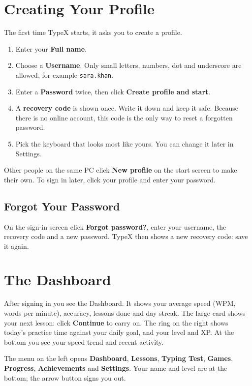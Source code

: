 \chapter{Creating Your Profile}
The first time TypeX starts, it asks you to create a profile.
\begin{enumerate}
\item Enter your \textbf{Full name}.
\item Choose a \textbf{Username}. Only small letters, numbers, dot and underscore are allowed, for example \texttt{sara.khan}.
\item Enter a \textbf{Password} twice, then click \textbf{Create profile and start}.
\item A \textbf{recovery code} is shown once. Write it down and keep it safe. Because there is no online account, this code is the only way to reset a forgotten password.
\item Pick the keyboard that looks most like yours. You can change it later in Settings.
\end{enumerate}
Other people on the same PC click \textbf{New profile} on the start screen to make their own. To sign in later, click your profile and enter your password.

\section{Forgot Your Password}
On the sign-in screen click \textbf{Forgot password?}, enter your username, the recovery code and a new password. TypeX then shows a new recovery code: save it again.

\chapter{The Dashboard}
After signing in you see the Dashboard. It shows your average speed (WPM, words per minute), accuracy, lessons done and day streak.
The large card shows your next lesson: click \textbf{Continue} to carry on. The ring on the right shows today's practice time against your daily goal, and your level and XP.
At the bottom you see your speed trend and recent activity.

The menu on the left opens \textbf{Dashboard}, \textbf{Lessons}, \textbf{Typing Test}, \textbf{Games}, \textbf{Progress}, \textbf{Achievements} and \textbf{Settings}. Your name and level are at the bottom; the arrow button signs you out.

